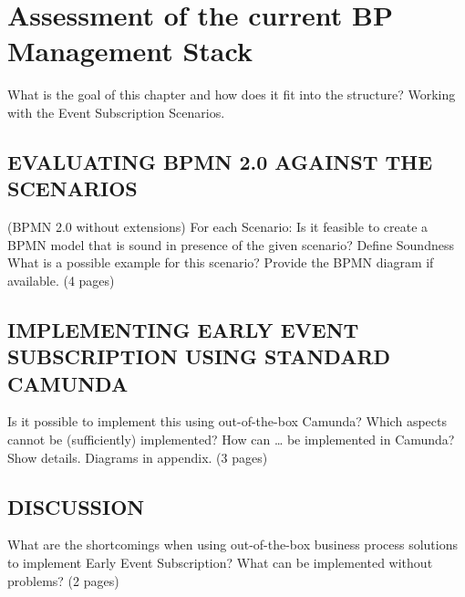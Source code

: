 \chapter{Assessment of the current BP Management Stack}\label{ch:assessment}

What is the goal of this chapter and how does it fit into the structure?
Working with the Event Subscription Scenarios.

\section{EVALUATING BPMN 2.0 AGAINST THE SCENARIOS}
(BPMN 2.0 without extensions)
For each Scenario: Is it feasible to create a BPMN model that is sound in presence of the given
scenario?
Define Soundness
What is a possible example for this scenario? Provide the BPMN diagram if available.
(4 pages)

\section{IMPLEMENTING EARLY EVENT SUBSCRIPTION USING STANDARD CAMUNDA}
Is it possible to implement this using out-of-the-box Camunda?
Which aspects cannot be (sufficiently) implemented?
How can … be implemented in Camunda? Show details. Diagrams in appendix.
(3 pages)

\section{DISCUSSION}
What are the shortcomings when using out-of-the-box business process solutions to implement
Early Event Subscription?
What can be implemented without problems?
(2 pages)